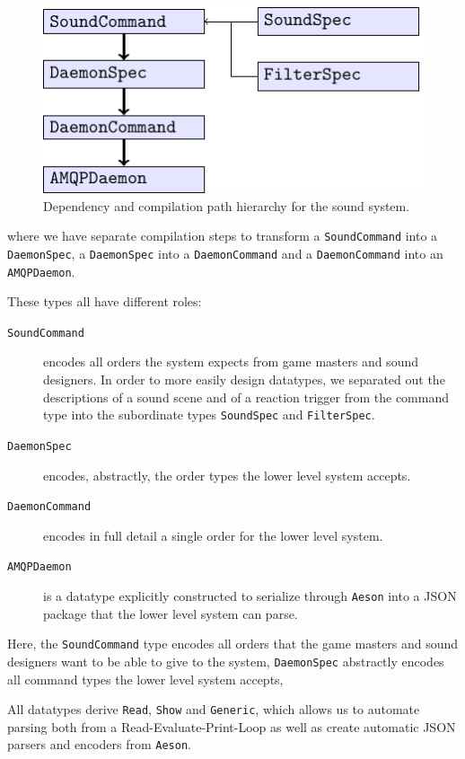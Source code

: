 \begin{figure}[H]
  \centering
  \includegraphics{figure}
  
  \caption{Dependency and compilation path hierarchy for the sound system.}
\label{fig:sshierarchy}
\end{figure}
where we have separate compilation steps to transform a \texttt{SoundCommand}
into a \texttt{DaemonSpec}, a \texttt{DaemonSpec} into a \texttt{DaemonCommand} and a
\texttt{DaemonCommand} into an \texttt{AMQPDaemon}.

These types all have different roles:
\begin{description}
\item[\tt SoundCommand] encodes all orders the system expects from
  game masters and sound designers. In order to more easily design
  datatypes, we separated out the descriptions of a sound scene and of
  a reaction trigger from the command type into the subordinate types
  \texttt{SoundSpec} and \texttt{FilterSpec}.
\item[\tt DaemonSpec] encodes, abstractly, the order types the lower
  level system accepts.
\item[\tt DaemonCommand] encodes in full detail a single order for the
  lower level system.
\item[\tt AMQPDaemon] is a datatype explicitly constructed to serialize
  through \texttt{Aeson} into a JSON package that the lower level
  system can parse.
\end{description}

Here, the \texttt{SoundCommand} type encodes all orders that the game
masters and sound designers want to be able to give to the system,
\texttt{DaemonSpec} abstractly encodes all command types the lower
level system accepts, 

All datatypes derive \texttt{Read}, \texttt{Show} and \texttt{Generic},
which allows us to automate parsing both from a Read-Evaluate-Print-Loop as well as
create automatic JSON parsers and encoders from \texttt{Aeson}. 


